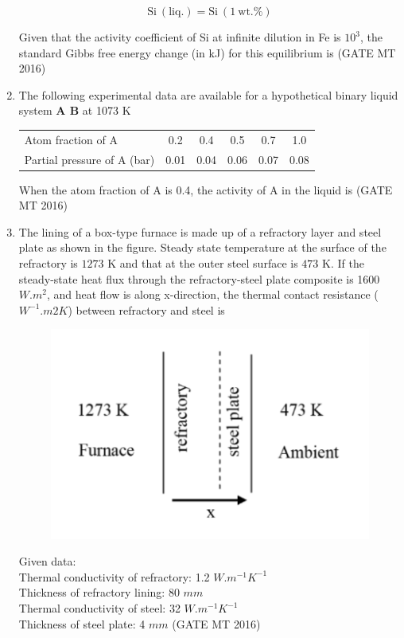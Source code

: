 \documentclass[journal, 11pt, onecolumn]{IEEEtran}
\theoremstyle{remark}
\begin{document}
\begin{enumerate}
$$\mathrm{Si\ (liq.)} = \mathrm{Si\ (1\ wt.\%)}$$

Given that the activity coefficient of Si at infinite dilution in Fe is $10^{3}$, the standard Gibbs free energy change (in kJ) for this equilibrium is 
\hfill(GATE MT 2016)

\item The following experimental data are available for a hypothetical binary liquid system \textbf{A B} at 1073 K

\begin{tabular}{lccccc}
Atom fraction of A & 0.2 & 0.4 & 0.5 & 0.7 & 1.0 \\
Partial pressure of A (bar) & 0.01 & 0.04 & 0.06 & 0.07 & 0.08 \\
\end{tabular}

When the atom fraction of A is 0.4, the activity of A in the liquid is 
\hfill(GATE MT 2016)

\item The lining of a box-type furnace is made up of a refractory layer and steel plate as shown in the figure. Steady state temperature at the surface of the refractory is $1273$ K and that at the outer steel surface is $473$ K. If the steady-state heat flux through the refractory-steel plate composite is 1600 $W.m^2$, and heat flow is along x-direction, the thermal contact resistance ($W^{-1}.m2K$) between refractory and steel is
\begin{figure}[H]
    \centering
    \includegraphics[width=0.5\linewidth]{figs/a6f4.png}
    \caption{}
    \label{fig:placeholder}
\end{figure}

    Given data:\\
    Thermal conductivity of refractory: 1.2 $W.m^{-1}K^{-1}$\\
    Thickness of refractory lining: 80 $mm$\\
    Thermal conductivity of steel: 32 $W.m^{-1}K^{-1}$\\
    Thickness of steel plate: 4 $mm$
\hfill(GATE MT 2016)


\end{enumerate}
\end{document}
